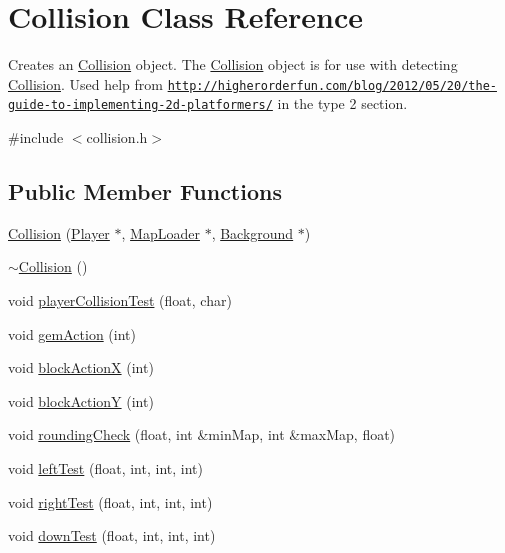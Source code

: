 \hypertarget{class_collision}{\section{Collision Class Reference}
\label{class_collision}
}


Creates an \hyperlink{class_collision}{Collision} object. The \hyperlink{class_collision}{Collision} object is for use with detecting \hyperlink{class_collision}{Collision}. Used help from \href{http://higherorderfun.com/blog/2012/05/20/the-guide-to-implementing-2d-platformers/}{\tt http\+://higherorderfun.\+com/blog/2012/05/20/the-\/guide-\/to-\/implementing-\/2d-\/platformers/} in the type 2 section.  




{\ttfamily \#include $<$collision.\+h$>$}

\subsection*{Public Member Functions}
\begin{DoxyCompactItemize}
\item 
\hyperlink{class_collision_ad31e4037d453108a21fc186cfc27fec9}{Collision} (\hyperlink{class_player}{Player} $\ast$, \hyperlink{class_map_loader}{Map\+Loader} $\ast$, \hyperlink{class_background}{Background} $\ast$)
\item 
\hyperlink{class_collision_a19ae49bcb3b16f4622443a34a171590c}{$\sim$\+Collision} ()
\item 
void \hyperlink{class_collision_a79a33125bb8ef50a883822b4c80b71ae}{player\+Collision\+Test} (float, char)
\item 
void \hyperlink{class_collision_a8a7c7bbaa789c0867559d79ef186dd84}{gem\+Action} (int)
\item 
void \hyperlink{class_collision_a8daccc0201f916f571afbbd8da992ffb}{block\+Action\+X} (int)
\item 
void \hyperlink{class_collision_ac4b2ae74fb5978743580f25ac2760f3a}{block\+Action\+Y} (int)
\item 
void \hyperlink{class_collision_a7b13afe2227a341d094d5bcb5e8e4905}{rounding\+Check} (float, int \&min\+Map, int \&max\+Map, float)
\item 
void \hyperlink{class_collision_a0cd628e6adcb69e216f9b469fa7c029c}{left\+Test} (float, int, int, int)
\item 
void \hyperlink{class_collision_a5aff01e79c9c42e7d71a57de7412dc58}{right\+Test} (float, int, int, int)
\item 
void \hyperlink{class_collision_a7c33a20a9c111630eeb8f0202605161e}{down\+Test} (float, int, int, int)
\end{DoxyCompactItemize}


